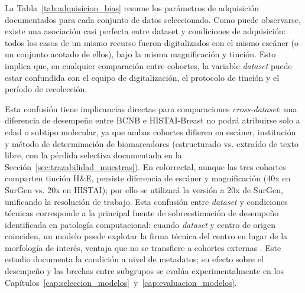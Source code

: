 La Tabla~\ref{tab:adquisicion_bias} resume los parámetros de adquisición documentados para cada conjunto de datos seleccionado. Como puede observarse, existe una asociación casi perfecta entre dataset y condiciones de adquisición: todos los casos de un mismo recurso fueron digitalizados con el mismo escáner (o un conjunto acotado de ellos), bajo la misma magnificación y tinción. Esto implica que, en cualquier comparación entre cohortes, la variable \textit{dataset} puede estar confundida con el equipo de digitalización, el protocolo de tinción y el período de recolección.

\begin{table}[htbp]
\centering
\caption{Parámetros de adquisición y riesgo de confusión entre cohortes de Mama y Colorrectal.}
\label{tab:adquisicion_bias}
\small
\setlength{\tabcolsep}{4pt}
\end{table}

Esta confusión tiene implicancias directas para comparaciones \textit{cross-dataset}: una diferencia de desempeño entre BCNB e HISTAI-Breast no podrá atribuirse solo a edad o subtipo molecular, ya que ambas cohortes difieren en escáner, institución y método de determinación de biomarcadores (estructurado vs. extraído de texto libre, con la pérdida selectiva documentada en la Sección~\ref{sec:trazabilidad_muestras}). En colorrectal, aunque las tres cohortes comparten tinción H\&E, persiste diferencia de escáner y magnificación (40x en SurGen vs. 20x en HISTAI); por ello se utilizará la versión a 20x de SurGen, unificando la resolución de trabajo. Esta confusión entre \textit{dataset} y condiciones técnicas corresponde a la principal fuente de sobreestimación de desempeño identificada en patología computacional: cuando \textit{dataset} y centro de origen coinciden, un modelo puede explotar la firma técnica del centro en lugar de la morfología de interés, ventaja que no se transfiere a cohortes externas \parencite{howard2021site}. Este estudio documenta la condición a nivel de metadatos; su efecto sobre el desempeño y las brechas entre subgrupos se evalúa experimentalmente en los Capítulos~\ref{cap:seleccion_modelos}~y~\ref{cap:evaluacion_modelos}.

